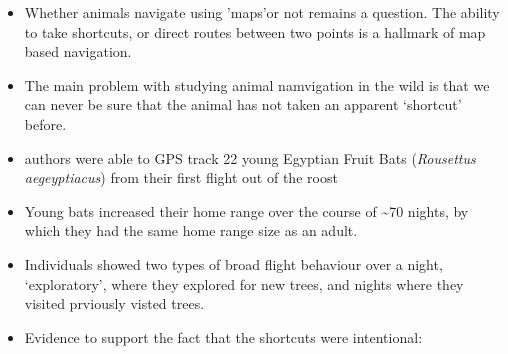 \documentclass[
]{book}
\begin{document}
\begin{itemize}
\item
  Whether animals navigate using 'maps'or not remains a question. The ability to take shortcuts, or direct routes between two points is a hallmark of map based navigation.
\item
  The main problem with studying animal namvigation in the wild is that we can never be sure that the animal has not taken an apparent `shortcut' before.
\item
  authors were able to GPS track 22 young Egyptian Fruit Bats (\emph{Rousettus aegeyptiacus}) from their first flight out of the roost
\item
  Young bats increased their home range over the course of \textasciitilde70 nights, by which they had the same home range size as an adult.
\item
  Individuals showed two types of broad flight behaviour over a night, `exploratory', where they explored for new trees, and nights where they visited prviously visted trees.
\item
  Evidence to support the fact that the shortcuts were intentional:


\end{itemize}
\end{document}
